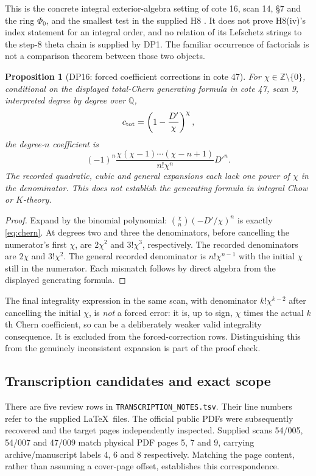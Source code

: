 \documentclass[11pt,a4paper]{article}
\newtheorem{proposition}[theorem]{Proposition}
\theoremstyle{definition}\newtheorem{remark}[theorem]{Remark}
\newcommand{\Z}{\mathbb Z}\newcommand{\Q}{\mathbb Q}\newcommand{\F}{\mathbb F}
\begin{document}
This is the concrete integral exterior-algebra setting of cote 16, scan 14, \S7 and the ring $\Phi_0$, and the smallest test in the supplied H8 \cite{Hunches}. It does not prove H8(iv)'s index statement for an integral order, and no relation of its Lefschetz strings to the step-8 theta chain is supplied by DP1. The familiar occurrence of factorials is not a comparison theorem between those two objects.

\begin{proposition}[DP16: forced coefficient corrections in cote 47]\label{DP16}
For $\chi\in\Z\setminus\{0\}$, conditional on the displayed total-Chern generating formula in cote 47, scan 9, interpreted degree by degree over $\Q$,
\[
 c_{\rm tot}=\left(1-\frac{D'}\chi\right)^\chi,
\]
the degree-$n$ coefficient is
\begin{equation}\label{eq:chern}
 (-1)^n\frac{\chi(\chi-1)\cdots(\chi-n+1)}{n!\chi^n}D'^n.
\end{equation}
The recorded quadratic, cubic and general expansions each lack one power of $\chi$ in the denominator. This does not establish the generating formula in integral Chow or $K$-theory.
\end{proposition}
\begin{proof}
Expand by the binomial polynomial: $\binom\chi n(-D'/\chi)^n$ is exactly \eqref{eq:chern}. At degrees two and three the denominators, before cancelling the numerator's first $\chi$, are $2\chi^2$ and $3!\chi^3$, respectively. The recorded denominators are $2\chi$ and $3!\chi^2$. The general recorded denominator is $n!\chi^{n-1}$ with the initial $\chi$ still in the numerator. Each mismatch follows by direct algebra from the displayed generating formula.
\end{proof}

The final integrality expression in the same scan, with denominator $k!\chi^{k-2}$ after cancelling the initial $\chi$, is \emph{not} a forced error: it is, up to sign, $\chi$ times the actual $k$th Chern coefficient, so can be a deliberately weaker valid integrality consequence. It is excluded from the forced-correction rows. Distinguishing this from the genuinely inconsistent expansion is part of the proof check.

\subsection{Transcription candidates and exact scope}

There are five review rows in \texttt{TRANSCRIPTION\_NOTES.tsv}. Their line numbers refer to the supplied \LaTeX\ files. The official public PDFs \cite{PublicArchive} were subsequently recovered and the target pages independently inspected. Supplied scans 54/005, 54/007 and 47/009 match physical PDF pages 5, 7 and 9, carrying archive/manuscript labels 4, 6 and 8 respectively. Matching the page content, rather than assuming a cover-page offset, establishes this correspondence.
\end{document}
